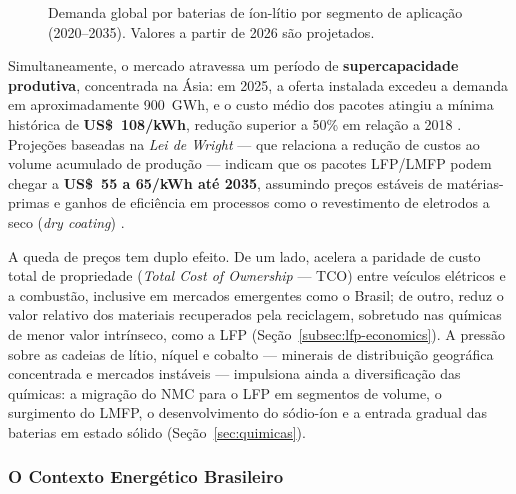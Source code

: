 \begin{figure}[H]

\caption{Demanda global por baterias de íon-lítio por segmento de aplicação
         (2020--2035). Valores a partir de 2026 são projetados.}
\label{fig:demanda-global-baterias}
\end{figure}

Simultaneamente, o mercado atravessa um período de \textbf{supercapacidade
produtiva}, concentrada na Ásia: em 2025, a oferta instalada excedeu a demanda em
aproximadamente 900~GWh, e o custo médio dos pacotes atingiu a mínima histórica de
\textbf{US\$~108/kWh}, redução superior a 50\% em relação a 2018
\cite{McKinsey2026}. Projeções baseadas na \textit{Lei de Wright} — que relaciona
a redução de custos ao volume acumulado de produção — indicam que os pacotes
LFP/LMFP podem chegar a \textbf{US\$~55 a 65/kWh até 2035}, assumindo preços
estáveis de matérias-primas e ganhos de eficiência em processos como o
revestimento de eletrodos a seco (\textit{dry coating}) \cite{EUROBAT}.

A queda de preços tem duplo efeito. De um lado, acelera a paridade de custo total
de propriedade (\textit{Total Cost of Ownership} — TCO) entre veículos elétricos
e a combustão, inclusive em mercados emergentes como o Brasil; de outro, reduz o
valor relativo dos materiais recuperados pela reciclagem, sobretudo nas químicas
de menor valor intrínseco, como a LFP (Seção~\ref{subsec:lfp-economics}). A
pressão sobre as cadeias de lítio, níquel e cobalto — minerais de distribuição
geográfica concentrada e mercados instáveis — impulsiona ainda a diversificação
das químicas: a migração do NMC para o LFP em segmentos de volume, o surgimento
do LMFP, o desenvolvimento do sódio-íon e a entrada gradual das baterias em
estado sólido (Seção~\ref{sec:quimicas}).

\subsubsection{O Contexto Energético Brasileiro}
\label{subsec:contexto-brasil}

